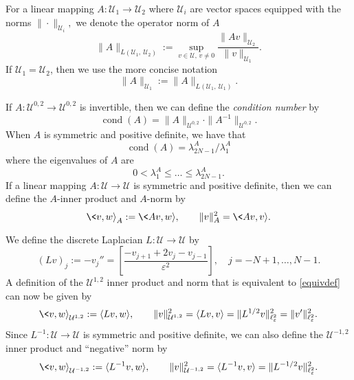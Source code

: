 \documentclass[12pt,reqno]{amsart}
\begin{document}
For a linear mapping $A: {\mathcal{U}}_1 \to {\mathcal{U}}_2$ where ${\mathcal{U}}_i$ are vector
spaces equipped with the norms $\|\cdot \|_{{\mathcal{U}}_i},$ we denote the
operator norm of $A$
\[
\|A\|_{L({\mathcal{U}}_1,\ {\mathcal{U}}_2)}:=\sup_{v\in{\mathcal{U}},\,v\ne 0}\frac {\|Av\|_{{\mathcal{U}}_2}}{\|v\|_{{\mathcal{U}}_1}}.
\]
If ${\mathcal{U}}_1={\mathcal{U}}_2$, then we use the more concise notation
\[
\|A\|_{{\mathcal{U}}_1} :=\|A\|_{L({\mathcal{U}}_1,\ {\mathcal{U}}_1)}.
\]

If $A: {\mathcal{U}}^{0,2} \to {\mathcal{U}}^{0,2}$ is invertible, then we can define the
{\em condition number} by
\[
\operatorname{cond}(A)=\|A\|_{{\mathcal{U}}^{0,2}}\cdot \|A^{-1}\|_{{\mathcal{U}}^{0,2}}.
\]
When $A$ is symmetric and positive definite, we have that
\[
\operatorname{cond}(A)=\lambda_{2N-1}^A/\lambda_1^A
\]
where the eigenvalues of $A$ are
\[
0<\lambda^A_1\le \dots \le \lambda_{2N-1}^A.
\]
If a linear mapping $A: {\mathcal{U}} \to {\mathcal{U}}$ is symmetric and positive
definite, then we can define the $A$-inner product and $A$-norm by
\[
\<v,w{\rangle}_A:=\<Av,w{\rangle},\qquad \|v\|_A^2=\<Av,v{\rangle}.
\]

We define the discrete Laplacian ${{L}}:{\mathcal{U}}\to{\mathcal{U}}$ by 
\begin{equation}\label{lap}
({{L}} {v})_j:=-v_j''=
	\left[\frac{-v_{j+1} + 2 v_{j} - v_{j-1}}{{\varepsilon}^2} \right], \quad j=-N+1,\dots, N-1.
\end{equation}
A definition of the ${\mathcal{U}}^{1,2}$ inner product and norm that is
equivalent to \eqref{equivdef} can now be given by
\begin{equation}\label{pos}
\<v,w{\rangle}_{{\mathcal{U}}^{1,2}}:={\langle}{{L}} v,w{\rangle},\qquad \|v\|_{{\mathcal{U}}^{1,2}}^2={\langle}{{L}} v,v{\rangle}
=\|{{L}}^{1/2}v\|_{\ell^2_{\varepsilon}}^2=\|v'\|_{\ell^2_{\varepsilon}}^2.
\end{equation}
Since ${{L}}^{-1}:{\mathcal{U}}\to{\mathcal{U}}$ is symmetric and positive definite, we can also define the
${\mathcal{U}}^{-1,2}$ inner product and ``negative'' norm by
\begin{equation}\label{neg}
\<v,w{\rangle}_{{\mathcal{U}}^{-1,2}}:={\langle}{{L}}^{-1}v,w{\rangle},\qquad \|v\|_{{\mathcal{U}}^{-1,2}}^2={\langle}{{L}}^{-1}v,v{\rangle}=\|{{L}}^{-1/2}v\|_{\ell^2_{\varepsilon}}^2.
\end{equation}
\end{document}
